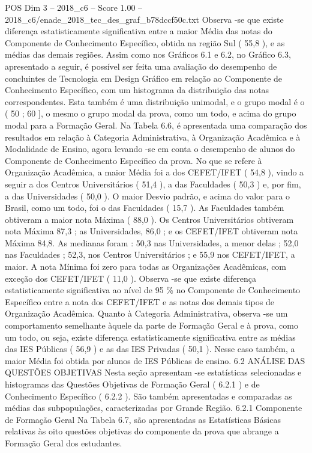 \begin{textsample}{POS Dim 3 – 2018\_c6 – Score 1.00 – 2018\_c6/enade\_2018\_tec\_des\_graf\_b78dccf50c.txt}
Observa -se que existe diferença estatisticamente significativa entre a maior Média das notas do Componente de Conhecimento Específico, obtida na região Sul ( 55,8 ), e as médias das demais regiões.
Assim como nos Gráficos 6.1 e 6.2, no Gráfico 6.3, apresentado a seguir, é possível ser feita uma avaliação do desempenho de concluintes de Tecnologia em Design Gráfico em relação ao Componente de Conhecimento Específico, com um histograma da distribuição das notas correspondentes.
Esta também é uma distribuição unimodal, e o grupo modal é o ( 50 ; 60 ], o mesmo o grupo modal da prova, como um todo, e acima do grupo modal para a Formação Geral.
Na Tabela 6.6, é apresentada uma comparação dos resultados em relação à Categoria Administrativa, à Organização Acadêmica e à Modalidade de Ensino, agora levando -se em conta o desempenho de alunos do Componente de Conhecimento Específico da prova.
No que se refere à Organização Acadêmica, a maior Média foi a dos CEFET/IFET ( 54,8 ), vindo a seguir a dos Centros Universitários ( 51,4 ), a das Faculdades ( 50,3 ) e, por fim, a das Universidades ( 50,0 ).
O maior Desvio padrão, e acima do valor para o Brasil, como um todo, foi o das Faculdades ( 15,7 ).
As Faculdades também obtiveram a maior nota Máxima ( 88,0 ).
Os Centros Universitários obtiveram nota Máxima 87,3 ; as Universidades, 86,0 ; e os CEFET/IFET obtiveram nota Máxima 84,8.
As medianas foram : 50,3 nas Universidades, a menor delas ; 52,0 nas Faculdades ; 52,3, nos Centros Universitários ; e 55,9 nos CEFET/IFET, a maior.
A nota Mínima foi zero para todas as Organizações Acadêmicas, com exceção dos CEFET/IFET ( 11,0 ).
Observa -se que existe diferença estatisticamente significativa ao nível de 95 \% no Componente de Conhecimento Específico entre a nota dos CEFET/IFET e as notas dos demais tipos de Organização Acadêmica.
Quanto à Categoria Administrativa, observa -se um comportamento semelhante àquele da parte de Formação Geral e à prova, como um todo, ou seja, existe diferença estatisticamente significativa entre as médias das IES Públicas ( 56,9 ) e as das IES Privadas ( 50,1 ).
Nesse caso também, a maior Média foi obtida por alunos de IES Públicas de ensino. 6.2 ANÁLISE DAS QUESTÕES OBJETIVAS Nesta seção apresentam -se estatísticas selecionadas e histogramas das Questões Objetivas de Formação Geral ( 6.2.1 ) e de Conhecimento Específico ( 6.2.2 ).
São também apresentadas e comparadas as médias das subpopulações, caracterizadas por Grande Região. 6.2.1 Componente de Formação Geral Na Tabela 6.7, são apresentadas as Estatísticas Básicas relativas às oito questões objetivas do componente da prova que abrange a Formação Geral dos estudantes.

\end{textsample}
